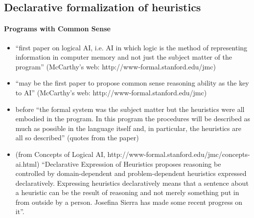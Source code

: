 \subsection{Declarative formalization of heuristics}

\paragraph{Programs with Common Sense \cite{mccarthy59a}}
\begin{itemize}
	\item ``first paper on logical AI, i.e. AI in which logic is the method of representing information 
	      in computer memory and not just the subject matter of the program''
	      (McCarthy's web: http://www-formal.stanford.edu/jmc)
	\item ``may be the first paper to propose common sense reasoning ability as the key to AI''
	      (McCarthy's web: http://www-formal.stanford.edu/jmc)
	\item before ``the formal system was the subject matter but the heuristics were all embodied in the program.
	      In this program the procedures will be described as much as possible in the language itself and, 
	      in particular, the heuristics are all so described'' (quotes from the paper)
	\item (from Concepts of Logical AI, http://www-formal.stanford.edu/jmc/concepts-ai.html)
	      ``Declarative Expression of Heuristics proposes reasoning be controlled by domain-dependent and 
	      problem-dependent heuristics expressed declaratively. Expressing heuristics declaratively
	      means that a sentence about a heuristic can be the result of reasoning and not merely something 
	      put in from outside by a person. Josefina Sierra has made some recent progress on it''.
\end{itemize}

